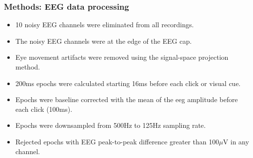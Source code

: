\documentclass{beamer}
\begin{document}
\begin{frame}
	\frametitle{Methods: EEG data processing}
	
	\begin{itemize}

		\item 10 noisy EEG channels were eliminated from all recordings.
		
		\item The noisy EEG channels were at the edge of the EEG cap.

		\item Eye movement artifacts were removed using the signal-space projection method. 

		\item 200ms epochs were calculated starting 16ms before each click or visual cue.

		\item Epochs were baseline corrected with the mean of the eeg amplitude before each click (100ms).

		\item Epochs were downsampled from 500Hz to 125Hz sampling rate.
	
		\item Rejected epochs with EEG peak-to-peak difference greater than 100$\mu$V in any channel.

	\end{itemize}

\end{frame}
\end{document}
